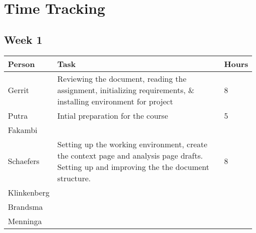 \chapter{Time Tracking}
\label{App: Time Tracking}

\section{Week 1}
\begin{tabular}{p{} p{} p{}}
    \textbf{Person} & \textbf{Task} & \textbf{Hours} \\ \hline
	Gerrit & Reviewing the document, reading the assignment, initializing requirements, \& installing environment for project & 8 \\ \hline
	Putra & Intial preparation for the course & 5 \\ \hline
	Fakambi & & \\ \hline
	Schaefers & Setting up the working environment, create the context page and analysis page drafts. Setting up and improving the the document structure. & 8\\ \hline
	Klinkenberg & & \\ \hline
	Brandsma & & \\ \hline
	Menninga & & \\ \hline
\end{tabular}